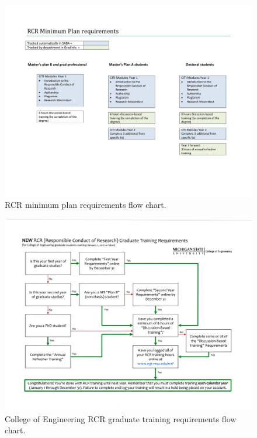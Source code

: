 \begin{center}
\begin{figure}[h]
  \includegraphics[width=\linewidth]{RCR_minimum_plan_requirements_flow_chart.pdf}
  \caption{RCR minimum plan requirements flow chart.}
  \label{fig:rcr_flowchart}
\end{figure}
\end{center}



\begin{center}
\begin{figure}[ht]
  \includegraphics[width=\linewidth]{EGR_RCR_Flowchart_Requirements_2017.pdf}
  \caption{College of Engineering RCR graduate training requirements flow chart.}
  \label{fig:egr_rcr_flowchart}
\end{figure}
\end{center}
